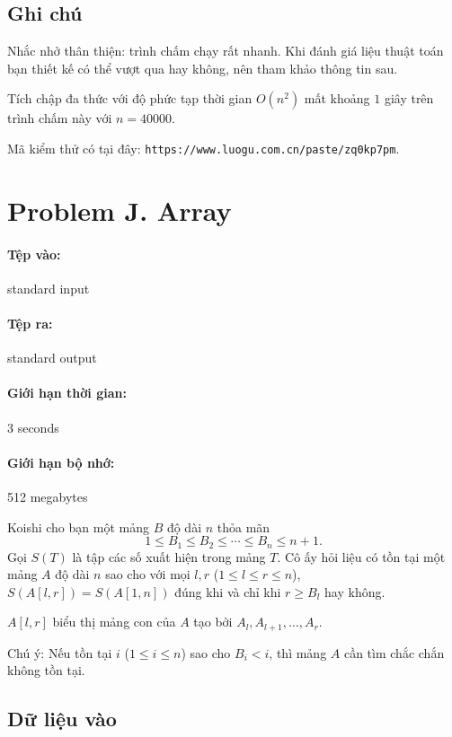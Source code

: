 \documentclass[11pt]{article}
\begin{document}
\subsection*{Ghi chú}

Nhắc nhở thân thiện: trình chấm chạy rất nhanh. Khi đánh giá liệu thuật toán
bạn thiết kế có thể vượt qua hay không, nên tham khảo thông tin sau.

Tích chập đa thức với độ phức tạp thời gian \(O(n^2)\) mất khoảng \(1\) giây
trên trình chấm này với \(n=40000\).

Mã kiểm thử có tại đây: \texttt{https://www.luogu.com.cn/paste/zq0kp7pm}.

\section{Problem J. Array}

\paragraph{Tệp vào:} standard input
\paragraph{Tệp ra:} standard output
\paragraph{Giới hạn thời gian:} 3 seconds
\paragraph{Giới hạn bộ nhớ:} 512 megabytes

Koishi cho bạn một mảng \(B\) độ dài \(n\) thỏa mãn
\[
  1\le B_1\le B_2\le \cdots\le B_n\le n+1.
\]
Gọi \(S(T)\) là tập các số xuất hiện trong mảng \(T\). Cô ấy hỏi liệu có tồn
tại một mảng \(A\) độ dài \(n\) sao cho với mọi \(l,r\) (\(1\le l\le r\le
n\)), \(S(A[l,r])=S(A[1,n])\) đúng khi và chỉ khi \(r\ge B_l\) hay không.

\(A[l,r]\) biểu thị mảng con của \(A\) tạo bởi \(A_l,A_{l+1},\ldots,A_r\).

Chú ý: Nếu tồn tại \(i\) (\(1\le i\le n\)) sao cho \(B_i<i\), thì mảng \(A\)
cần tìm chắc chắn không tồn tại.

\subsection*{Dữ liệu vào}
\end{document}
